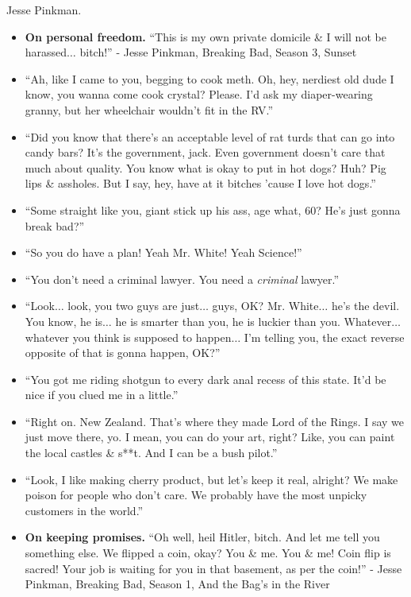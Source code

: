 \documentclass{article}
\begin{document}
\begin{enumerate}
\begin{itemize}
	\end{itemize}
	{\sc Jesse Pinkman.}
	\begin{itemize}
		\item {\bf On personal freedom.} ``This is my own private domicile \& I will not be harassed$\ldots$ bitch!'' - Jesse Pinkman, Breaking Bad, Season 3, Sunset
		\item ``Ah, like I came to you, begging to cook meth. Oh, hey, nerdiest old dude I know, you wanna come cook crystal? Please. I'd ask my diaper-wearing granny, but her wheelchair wouldn't fit in the RV.''
		\item ``Did you know that there's an acceptable level of rat turds that can go into candy bars? It's the government, jack. Even government doesn't care that much about quality. You know what is okay to put in hot dogs? Huh? Pig lips \& assholes. But I say, hey, have at it bitches 'cause I love hot dogs.''
		\item ``Some straight like you, giant stick up his ass, age what, 60? He's just gonna break bad?''
		\item ``So you do have a plan! Yeah Mr. White! Yeah Science!''
		\item ``You don't need a criminal lawyer. You need a \emph{criminal} lawyer.''
		\item ``Look$\ldots$ look, you two guys are just$\ldots$ guys, OK? Mr. White$\ldots$ he's the devil. You know, he is$\ldots$ he is smarter than you, he is luckier than you. Whatever$\ldots$ whatever you think is supposed to happen$\ldots$ I'm telling you, the exact reverse opposite of that is gonna happen, OK?''
		\item ``You got me riding shotgun to every dark anal recess of this state. It'd be nice if you clued me in a little.''
		\item ``Right on. New Zealand. That's where they made Lord of the Rings. I say we just move there, yo. I mean, you can do your art, right? Like, you can paint the local castles \& s**t. And I can be a bush pilot.''
		\item ``Look, I like making cherry product, but let's keep it real, alright? We make poison for people who don't care. We probably have the most unpicky customers in the world.''
		\item {\bf On keeping promises.} ``Oh well, heil Hitler, bitch. And let me tell you something else. We flipped a coin, okay? You \& me. You \& me! Coin flip is sacred! Your job is waiting for you in that basement, as per the coin!'' - Jesse Pinkman, Breaking Bad, Season 1, And the Bag's in the River

\end{itemize}
\end{enumerate}
\end{document}
